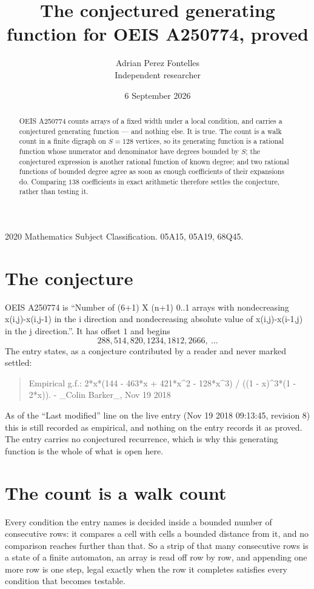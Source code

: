 \documentclass[11pt,a4paper]{article}
\title{The conjectured generating function for OEIS A250774, proved}
\author{Adrian Perez Fontelles\\ \small Independent researcher}
\date{6 September 2026}
\theoremstyle{plain}
\theoremstyle{definition}
\begin{document}
\maketitle

\begin{abstract}
OEIS A250774 counts arrays of a fixed width under a local condition, and carries a conjectured
generating function --- and nothing else. It is true. The count is a walk count in a finite
digraph on $S=128$ vertices, so its generating function is a rational function whose numerator
and denominator have degrees bounded by $S$; the conjectured expression is another rational
function of known degree; and two rational functions of bounded degree agree as soon as enough
coefficients of their expansions do. Comparing $138$ coefficients in exact arithmetic
therefore settles the conjecture, rather than testing it.
\end{abstract}

\noindent\small 2020 Mathematics Subject Classification. 05A15, 05A19, 68Q45.\normalsize

\section{The conjecture}

OEIS A250774 is ``Number of (6+1) X (n+1) 0..1 arrays with nondecreasing x(i,j)-x(i,j-1) in the i direction and nondecreasing absolute value of x(i,j)-x(i-1,j) in the j direction.''. It has offset $1$ and begins
\[
288, 514, 820, 1234, 1812, 2666,\ \dots
\]
The entry states, as a conjecture contributed by a reader and never marked settled:
\begin{quote}
Empirical g.f.: 2*x*(144 - 463*x + 421*x\^{}2 - 128*x\^{}3) / ((1 - x)\^{}3*(1 - 2*x)). - \_Colin Barker\_, Nov 19 2018
\end{quote}
As of the ``Last modified'' line on the live entry (Nov 19 2018 09:13:45, revision 8) this is still
recorded as empirical, and nothing on the entry records it as proved. The entry carries no
conjectured recurrence, which is why this generating function is the whole of what is open
here.

\section{The count is a walk count}

Every condition the entry names is decided inside a bounded number of consecutive rows: it
compares a cell with cells a bounded distance from it, and no comparison reaches further than
that. So a strip of that many consecutive rows is a state of a finite automaton, an array is
read off row by row, and appending one more row is one step, legal exactly when the row it
completes satisfies every condition that becomes testable.
\end{document}
